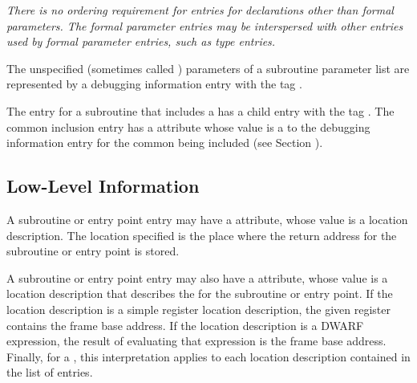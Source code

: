 \textit{There is no ordering requirement for entries for declarations
other than formal parameters. The formal parameter
entries may be interspersed with other entries used by formal
parameter entries, such as type entries.}

The unspecified (sometimes called ) 
parameters of a subroutine parameter list are
represented by a debugging information 
entry
with the tag \DWTAGunspecifiedparametersTARG.

The entry for a subroutine that includes a
has a child entry with the 
tag \DWTAGcommoninclusionTARG. 
The\hypertarget{chap:commonreferencecommonblockusage}{}
common inclusion entry has a 
\DWATcommonreferenceDEFN{} attribute
whose value is a  
to the debugging information entry
for the common  being included 
(see Section ).

\subsection{Low-Level Information}
\label{chap:lowlevelinformation}

A\hypertarget{chap:DWATreturnaddrsubroutinereturnaddresssavelocation}{}
subroutine or entry point entry may have a 
\DWATreturnaddrDEFN{}
attribute, whose value is a location description. The location
specified is the place where the return address for the
subroutine or entry point is stored.

A\hypertarget{chap:DWATframebasesubroutineframebaseaddress}{}
subroutine or entry point entry may also have a
\DWATframebaseDEFN{} attribute, whose value is a location
description that describes the  for the
subroutine or entry point. If the location description is
a simple register location description, the given register
contains the frame base address. If the location description is
a DWARF expression, the result of evaluating that expression
is the frame base address. Finally, for a 
,
this interpretation applies to each location description
contained in the list of  entries.

